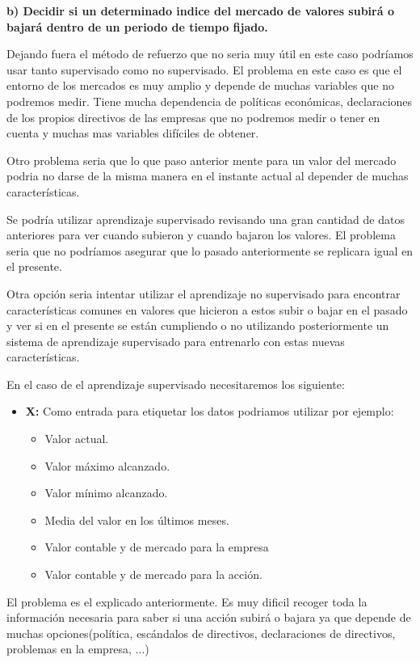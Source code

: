 \documentclass[titlepage]{article}
\begin{document}
		
		\textbf{b) Decidir si un determinado indice del mercado de valores subirá o bajará dentro de un
		periodo de tiempo fijado.}
		\newline
	
		Dejando fuera el método de refuerzo que no seria muy útil en este caso podríamos usar tanto supervisado como no supervisado. 
		El problema en este caso es que el entorno de los mercados es muy amplio y depende de muchas variables que no podremos medir. Tiene mucha dependencia de políticas económicas, declaraciones de los propios directivos de las empresas que no podremos medir o tener en cuenta y muchas mas variables difíciles de obtener. 
		
		Otro problema seria que lo que paso anterior mente para un valor del mercado podria no darse de la misma manera en el instante actual al depender de muchas características. 
		
		Se podría utilizar aprendizaje supervisado revisando una gran cantidad de datos anteriores para ver cuando subieron y cuando bajaron los valores. El problema seria que no podríamos asegurar que lo pasado anteriormente se replicara igual en el presente. 
		
		Otra opción seria intentar utilizar el aprendizaje no supervisado para encontrar características comunes en valores que hicieron a estos subir o bajar en el pasado y ver si en el presente se están cumpliendo o no utilizando posteriormente un sistema de aprendizaje supervisado para entrenarlo con estas nuevas características.
		
		En el caso de el aprendizaje supervisado necesitaremos los siguiente:
		\begin{itemize}
			\item \textbf{X: } Como entrada para etiquetar los datos podriamos utilizar por ejemplo:
			\begin{itemize}
				\item Valor actual.
				\item Valor máximo alcanzado.
				\item Valor mínimo alcanzado.
				\item Media del valor en los últimos meses.
				\item Valor contable y de mercado para la empresa
				\item Valor contable y de mercado para la acción.
			\end{itemize}
		\end{itemize}
	
		El problema es el explicado anteriormente. Es muy dificil recoger toda la información necesaria para saber si una acción subirá o bajara ya que depende de muchas opciones(política, escándalos de directivos, declaraciones de directivos, problemas en la empresa, ...)
		
\end{document}

